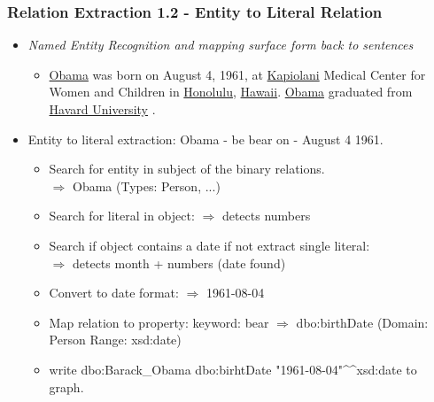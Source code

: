 \documentclass{beamer}
\begin{document}
\begin{frame}
\frametitle{Relation Extraction 1.2 - Entity to Literal Relation}
\begin{example}
	\begin{itemize}
	\item \textit{Named Entity Recognition and mapping surface form back to sentences} \\
	\begin{itemize} \item \underline{Obama} was born on August 4, 1961, at \underline{Kapiolani} Medical Center for Women and Children in \underline{Honolulu}, \underline{Hawaii}. \underline{Obama} graduated from \underline{Havard University} .
	\end{itemize}
	\item Entity to literal extraction: Obama - be bear on - August 4 1961. \begin{itemize} \item Search for entity in subject of the binary relations. \\ $\Rightarrow$ Obama (Types: Person, ...) 
	\item Search for literal in object: $\Rightarrow$ detects numbers 
	\item Search if object contains a date if not extract single literal: \\ $\Rightarrow$ detects month + numbers (date found)
	\item Convert to date format: $\Rightarrow$  1961-08-04
	\item Map relation to property: keyword: bear  $\Rightarrow$ dbo:birthDate (Domain: Person Range: xsd:date)
	\item write dbo:Barack\_Obama dbo:birhtDate "1961-08-04"\textasciicircum{}\textasciicircum{}xsd:date to graph.
	\end{itemize}		 
\end{itemize}
\end{example}
\end{frame}
\end{document}
